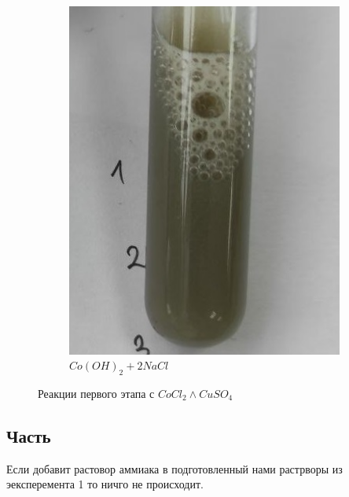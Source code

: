 \begin{figure}[h]
\begin{subfigure}[b]{0.45\textwidth}
        \includegraphics[width=\textwidth]{Ex_5/Co_2.jpg}
        \caption{$Co(OH)_2 + 2NaCl$}
    \end{subfigure}
    \caption{Реакции первого этапа с $CoCl_2 \land CuSO_4$}
\end{figure}


\subsection{Часть}

Если добавит растовор аммиака в подготовленный нами растрворы 
из эексперемента 1 то ничго не происходит. 









